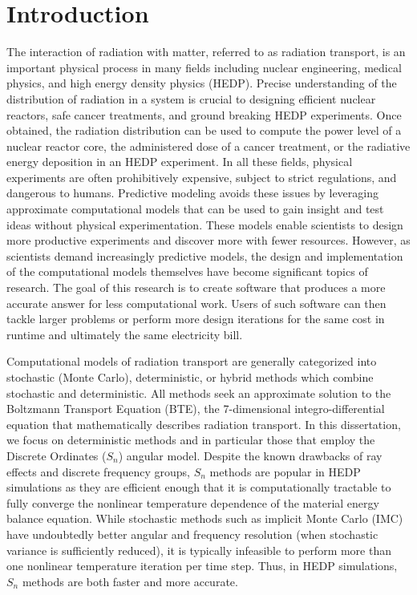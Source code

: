 \documentclass[doc.tex]{subfiles}
\begin{document}
\chapter{Introduction}
The interaction of radiation with matter, referred to as radiation transport, is an important physical process in many fields including nuclear engineering, medical physics, and high energy density physics (HEDP). Precise understanding of the distribution of radiation in a system is crucial to designing efficient nuclear reactors, safe cancer treatments, and ground breaking HEDP experiments. Once obtained, the radiation distribution can be used to compute the power level of a nuclear reactor core, the administered dose of a cancer treatment, or the radiative energy deposition in an HEDP experiment. In all these fields, physical experiments are often prohibitively expensive, subject to strict regulations, and dangerous to humans. Predictive modeling avoids these issues by leveraging approximate computational models that can be used to gain insight and test ideas without physical experimentation. These models enable scientists to design more productive experiments and discover more with fewer resources. However, as scientists demand increasingly predictive models, the design and implementation of the computational models themselves have become significant topics of research. The goal of this research is to create software that produces a more accurate answer for less computational work. Users of such software can then tackle larger problems or perform more design iterations for the same cost in runtime and ultimately the same electricity bill. 

Computational models of radiation transport are generally categorized into stochastic (Monte Carlo), deterministic, or hybrid methods which combine stochastic and deterministic. All methods seek an approximate solution to the Boltzmann Transport Equation (BTE), the 7-dimensional integro-differential equation that mathematically describes radiation transport. In this dissertation, we focus on deterministic methods and in particular those that employ the Discrete Ordinates ($S_n$) angular model. Despite the known drawbacks of ray effects and discrete frequency groups, $S_n$ methods are popular in HEDP simulations as they are efficient enough that it is computationally tractable to fully converge the nonlinear temperature dependence of the material energy balance equation. While stochastic methods such as implicit Monte Carlo (IMC) have undoubtedly better angular and frequency resolution (when stochastic variance is sufficiently reduced), it is typically infeasible to perform more than one nonlinear temperature iteration per time step. Thus, in HEDP simulations, $S_n$ methods are both faster and more accurate. 
\end{document}
